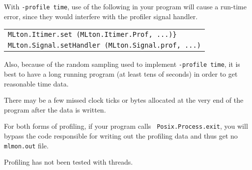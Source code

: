 With {\tt -profile time}, use of the following in your program will
cause a run-time error, since they would interfere with the profiler
signal handler.\\
\begin{tabular}{l}
\tt MLton.Itimer.set (MLton.Itimer.Prof, ...)\}\\
\tt MLton.Signal.setHandler (MLton.Signal.prof, ...)
\end{tabular}
Also, because of the random sampling used to implement {\tt -profile
time}, it is best to have a long running program (at least tens of
seconds) in order to get reasonable time data.

There may be a few missed clock ticks or bytes allocated at the
very end of the program after the data is written.

For both forms of profiling, if your program calls {\tt
Posix.Process.exit}, you will bypass the code responsible for writing
out the profiling data and thus get no {\tt mlmon.out} file.

Profiling has not been tested with threads.

